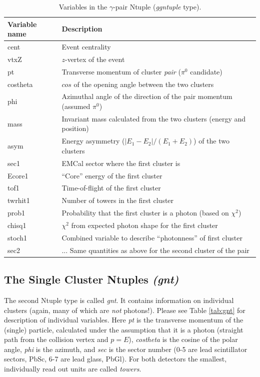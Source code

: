 \documentclass[pdftex,12pt,letter]{article}
\begin{document}
\begin{table}[h]
  \begin{tabular}{|l|l|} \hline
    Variable name & Description \\ \hline
    cent & Event centrality \\
    vtxZ & $z$-vertex of the event \\
    pt   & Transverse momentum of cluster {\it pair} ($\pi^0$
    candidate) \\
    costheta & $cos$ of the opening angle between the two clusters \\    
    phi & Azimuthal angle of the direction of the pair momentum
    (assumed $\pi^0$) \\
    mass & Invariant mass calculated from the two clusters (energy and
    position) \\
    asym & Energy asymmetry ($|E_1-E_2|/(E_1+E_2)$) of the two clusters \\
    sec1 & EMCal sector where the first cluster is \\
    Ecore1 & ``Core'' energy of the first cluster \\
    tof1   & Time-of-flight of the first cluster \\
    twrhit1 & Number of towers in the first cluster \\
    prob1 & Probability that the first cluster is a photon (based on
    $\chi^2$) \\
    chisq1 & $\chi^2$ from expected photon shape for the first cluster
    \\
    stoch1 & Combined variable to describe ``photonness'' of first
    cluster \\
    sec2 & ...  Same quantities as above for the second cluster of the
    pair \\ \hline
  \end{tabular}
  \vspace{0.3cm}
  \caption{Variables in the $\gamma$-pair Ntuple ({\it ggntuple} type).
}
  \label{tab:ggntuple}
 \end{table}

\subsection{The Single Cluster Ntuples \it{(gnt)}}
The second Ntuple type is called {\it gnt}. It contains information on
individual clusters (again, many of which are {\it not} photons!).
Please see Table \ref{tab:gnt} for description of individual variables.
Here {\it pt} is the transverse momentum of the (single) particle,
calculated under the assumption that it is a photon (straight path
from the collision vertex and $p=E$), {\it costheta} is the cosine of
the polar angle, {\it phi} is the azimuth, and {\it sec} is the sector
number (0-5 are lead scintillator sectors, PbSc, 6-7 are lead glass,
PbGl).  For both detectors the smallest, individually read out units
are called {\it towers}.
\end{document}

